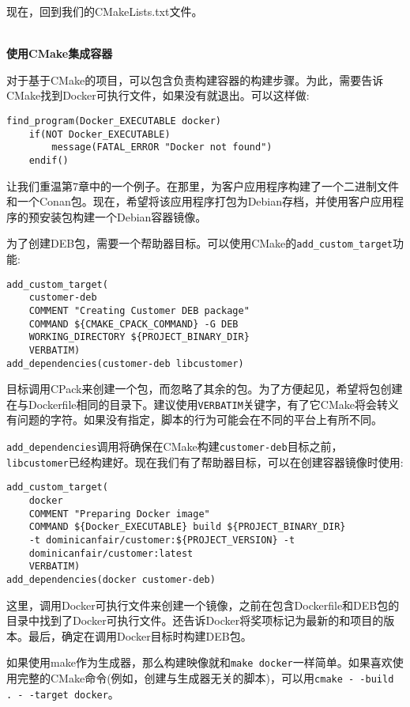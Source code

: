 现在，回到我们的CMakeLists.txt文件。

\hspace*{\fill} \\ %
\noindent
\textbf{使用CMake集成容器}

对于基于CMake的项目，可以包含负责构建容器的构建步骤。为此，需要告诉CMake找到Docker可执行文件，如果没有就退出。可以这样做:

\begin{lstlisting}[style=styleCMake]
find_program(Docker_EXECUTABLE docker)
	if(NOT Docker_EXECUTABLE)
		message(FATAL_ERROR "Docker not found")
	endif()
\end{lstlisting}

让我们重温第7章中的一个例子。在那里，为客户应用程序构建了一个二进制文件和一个Conan包。现在，希望将该应用程序打包为Debian存档，并使用客户应用程序的预安装包构建一个Debian容器镜像。

为了创建DEB包，需要一个帮助器目标。可以使用CMake的\texttt{add\_custom\_target}功能:

\begin{lstlisting}[style=styleCMake]
add_custom_target(
	customer-deb
	COMMENT "Creating Customer DEB package"
	COMMAND ${CMAKE_CPACK_COMMAND} -G DEB
	WORKING_DIRECTORY ${PROJECT_BINARY_DIR}
	VERBATIM)
add_dependencies(customer-deb libcustomer)
\end{lstlisting}

目标调用CPack来创建一个包，而忽略了其余的包。为了方便起见，希望将包创建在与Dockerfile相同的目录下。建议使用\texttt{VERBATIM}关键字，有了它CMake将会转义有问题的字符。如果没有指定，脚本的行为可能会在不同的平台上有所不同。

\texttt{add\_dependencies}调用将确保在CMake构建\texttt{customer-deb}目标之前，\texttt{libcustomer}已经构建好。现在我们有了帮助器目标，可以在创建容器镜像时使用:

\begin{lstlisting}[style=styleCMake]
add_custom_target(
	docker
	COMMENT "Preparing Docker image"
	COMMAND ${Docker_EXECUTABLE} build ${PROJECT_BINARY_DIR}
	-t dominicanfair/customer:${PROJECT_VERSION} -t
	dominicanfair/customer:latest
	VERBATIM)
add_dependencies(docker customer-deb)
\end{lstlisting}

这里，调用Docker可执行文件来创建一个镜像，之前在包含Dockerfile和DEB包的目录中找到了Docker可执行文件。还告诉Docker将奖项标记为最新的和项目的版本。最后，确定在调用Docker目标时构建DEB包。

如果使用make作为生成器，那么构建映像就和\texttt{make docker}一样简单。如果喜欢使用完整的CMake命令(例如，创建与生成器无关的脚本)，可以用\texttt{cmake -\,-build . -\,-target docker}。













